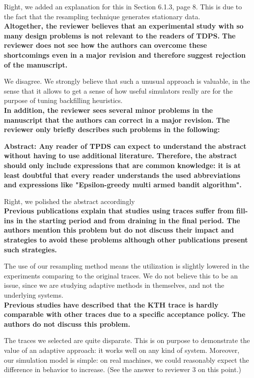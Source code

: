 \documentclass[]{article}
\begin{document}
Right, we added an explanation for this in Section 6.1.3, page 8. This is due to the fact
that the resampling technique generates stationary data.\\

\textbf{Altogether, the reviewer believes that an experimental study with so
many design problems is not relevant to the readers of TDPS. }
\textbf{The reviewer does not see how the authors can overcome these
shortcomings even in a major revision and therefore suggest rejection of the
manuscript.}

We disagree. We strongly believe that such a unusual approach is valuable,
in the sense that it allows to get a sense of how useful simulators really are
for the purpose of tuning backfilling heuristics.\\

\textbf{In addition, the reviewer sees several minor problems in the manuscript
that the authors can correct in a major revision. The reviewer only briefly
describes such problems in the following:}

\textbf{Abstract: Any reader of TPDS can expect to understand the abstract
without having to use additional literature. Therefore, the abstract should
only include expressions that are common knowledge: it is at least doubtful
that every reader understands the used abbreviations and expressions like
"Epsilon-greedy multi armed bandit algorithm". }

Right, we polished the abstract accordingly\\

\textbf{Previous publications explain that studies using traces suffer from
fill-ins in the starting period and from draining in the final period. The
authors mention this problem but do not discuss their impact and strategies to
avoid these problems although other publications present such strategies.}

The use of our resampling method means the utilization is slightly lowered in
the experiments comparing to the original traces. We do not believe this to be
an issue, since we are studying adaptive methods in themselves, and not the 
underlying systems.\\

\textbf{Previous studies have described that the KTH trace is hardly comparable with
other traces due to a specific acceptance policy. The authors do not discuss
this problem.}

The traces we selected are quite disparate. This is on purpose to demonstrate
the value of an adaptive approach: it works well on any kind of system.
Moreover, our simulation model is simple: on real machines, we could reasonably
expect the difference in behavior to increase. (See the answer to reviewer 3
on this point.)\\
\end{document}
